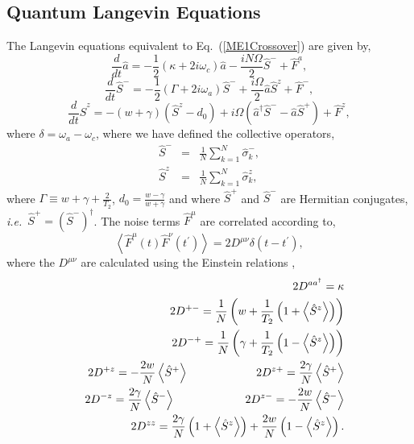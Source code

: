 \documentclass[aps,
twocolumn,
superscriptaddress,groupedaddress]{revtex4}
\begin{document}
\subsection{Quantum Langevin Equations}

The Langevin equations equivalent to Eq.~(\ref{ME1Crossover}) are given
by,
\begin{equation}
\frac{d}{dt} \hat{a}= -\frac{1}{2} (\kappa +2i\omega_c) \hat{a}
-\frac{i N \Omega}{2} \hat{S}^{-}
+\hat{F}^{a},
\label{La}
\end{equation}
\begin{equation}
\frac{d}{dt} \hat{S}^{-} =
-\frac{1}{2} \left(\Gamma +2 i \omega_a \right)  \hat{S}^{-}
+\frac{i \Omega}{2} \hat{a} \hat{S}^{z}
+\hat{F}^{-},
\label{Lsm}
\end{equation}
\begin{equation}
\frac{d}{dt} \hat{S}^{z} =
-(w+\gamma)\left( \hat{S}^{z} - d_0\right)
+i\Omega \left( \hat{a}^{\dagger}\hat{S}^{-} -
\hat{a}\hat{S}^{+} \right)
+\hat{F}^{z},
\label{Lsz}
\end{equation}
where $\delta=\omega_{a}-\omega_{c}$, where we have defined the collective
operators,
\begin{eqnarray}
\hat{S}^{-}&=&\frac{1}{N}\sum_{k=1}^N \hat{\sigma}_k^{-},
\nonumber
\\
\hat{S}^{z}&=&\frac{1}{N}\sum_{k=1}^N \hat{\sigma}_k^{z},
\nonumber
\end{eqnarray}
where $\Gamma \equiv w+\gamma+\frac{2}{T_2}$, $d_0 =
\frac{w-\gamma}{w+\gamma}$ and where $\hat{S}^{+}$ and $\hat{S}^{-}$ are Hermitian conjugates, {\em i.e.}\ $\hat{S}^{+} = (\hat{S}^{-})^{\dagger}$. The noise terms $\hat F^\mu$ are correlated
according to,
\begin{equation}
\left< \hat{F}^{\mu}(t) \hat{F}^{\nu}(t^{\prime})\right> =
2 D^{\mu \nu} \delta(t-t^{\prime}),
\end{equation}
where the $D^{\mu \nu} $ are calculated using the Einstein relations
\cite{meystre2007elements},
\begin{eqnarray}
&& 2D^{a a^{\dagger}}= \kappa \nonumber \\
&& 2D^{+-}= \frac{1}{N}
\left(
  w + \frac{1}{T_2} \left(1 + \left< \hat{S}^{z} \right> \right)
\right) \nonumber \\
&& 2D^{-+}= \frac{1}{N}
\left(
  \gamma + \frac{1}{T_2} \left(1- \left< \hat{S}^{z} \right> \right)
\right) \nonumber \\
&& 2D^{+z}= -\frac{2w}{N} \left< \hat{S}^{+} \right>
\hspace{0.83in} 2D^{z+}= \frac{2\gamma}{N} \left< \hat{S}^{+} \right>
\nonumber \\
&& 2D^{-z}= \frac{2\gamma}{N} \left< \hat{S}^{-} \right>
\hspace{0.86in} 2D^{z-}= -\frac{2w}{N} \left< \hat{S}^{-} \right>
\nonumber \\
&& 2D^{zz}= \frac{2\gamma}{N}
\left(1+ \left< \hat{S}^{z} \right> \right) +
\frac{2w}{N}\left(1- \left< \hat{S}^{z} \right> \right).
\label{OpNoise1}
\end{eqnarray}
\end{document}
